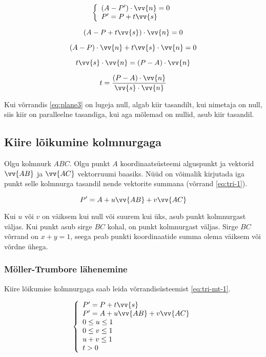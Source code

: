 \documentclass[a4paper,12pt]{report}
\renewcommand{\vec}[1]{\vv{#1}}
\begin{document}
\begin{equation} \label{eq:plane2}
\left\{
\begin{array}{l}
(A - P') \cdot \vec n = 0 \\
P' = P + t\vec s
\end{array}
\right.
\end{equation}

\[(A - P + t\vec s) \cdot \vec n = 0\]

\[(A - P) \cdot \vec n + t\vec s \cdot \vec n = 0\]

\[t\vec s \cdot \vec n = (P-A) \cdot \vec n\]

\begin{equation} \label{eq:plane3}
t = \frac{(P-A) \cdot \vec n}{\vec s \cdot \vec n}
\end{equation}

Kui võrrandis \ref{eq:plane3} on lugeja null, algab kiir tasandilt, kui
nimetaja on null, siis kiir on paralleelne tasandiga, kui aga mõlemad on
nullid, asub kiir tasandil.

\subsection{Kiire lõikumine kolmnurgaga}
Olgu kolmnurk \(ABC\). Olgu punkt \(A\) koordinaatsüsteemi alguspunkt ja
vektorid \(\vec{AB}\) ja \(\vec{AC}\) vektorruumi baasiks. Nüüd on
võimalik kirjutada iga punkt selle kolmnurga tasandil nende vektorite
summana (võrrand \ref{eq:tri-1}).

\begin{equation} \label{eq:tri-1}
P' = A + u\vec{AB} + v\vec{AC}
\end{equation}

Kui \(u\) või \(v\) on väiksem kui null või suurem kui üks, asub punkt
kolmnurgast väljas. Kui punkt asub sirge \(BC\) kohal, on punkt
kolmnurgast väljas. Sirge \(BC\) võrrand on \(x + y = 1\), seega peab
punkti koordinaatide summa olema väiksem või võrdne ühega.

\subsubsection{Möller-Trumbore lähenemine}
Kiire lõikumise kolmnurgaga saab leida võrrandisüsteemist \ref{eq:tri-mt-1}.

\begin{equation} \label{eq:tri-mt-1}
\left\{
\begin{array}{l}
P' = P + t\vec s \\
P' = A + u\vec{AB} + v\vec{AC} \\
0 \leq u \leq 1 \\
0 \leq v \leq 1 \\
u + v \leq 1 \\
t > 0 
\end{array}
\right.
\end{equation}
\end{document}
